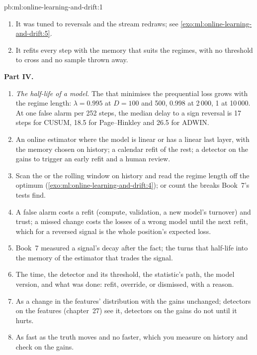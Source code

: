 \begin{solution}{pb:ml:online-learning-and-drift:1}
\begin{enumerate}[resume]
\item It was tuned to reversals and the stream redraws; see \cref{exo:ml:online-learning-and-drift:5}.
\item It refits every step with the memory that suits the regimes, with no threshold to cross and no sample thrown away.
\end{enumerate}
\textbf{Part IV.}
\begin{enumerate}[resume]
\item \emph{The half-life of a model.} The  that minimises the prequential loss grows with the regime
length: $\lambda = 0.995$ at $D = 100$ and 500, 0.998 at 2\,000, 1 at 10\,000. At one false alarm per 252 steps, the median
delay to a sign reversal is 17 steps for CUSUM, 18.5 for Page--Hinkley and 26.5 for ADWIN.
\item An online estimator where the model is linear or has a linear last layer, with the memory chosen on history; a
calendar refit of the rest; a detector on the gains to trigger an early refit and a human review.
\item Scan the  or the rolling window on history and read the regime length off the optimum
(\cref{exo:ml:online-learning-and-drift:4}); or count the breaks Book~7's tests find.
\item A false alarm costs a refit (compute, validation, a new model's turnover) and trust; a missed change costs the
losses of a wrong model until the next refit, which for a reversed signal is the whole position's expected loss.
\item Book~7 measured a signal's decay after the fact; the  turns that half-life into the memory of the
estimator that trades the signal.
\item The time, the detector and its threshold, the statistic's path, the model version, and what was done: refit,
override, or dismissed, with a reason.
\item As a change in the features' distribution with the gains unchanged; detectors on the features (chapter~27) see it,
detectors on the gains do not until it hurts.
\item As fast as the truth moves and no faster, which you measure on history and check on the gains.
\end{enumerate}
\end{solution}

